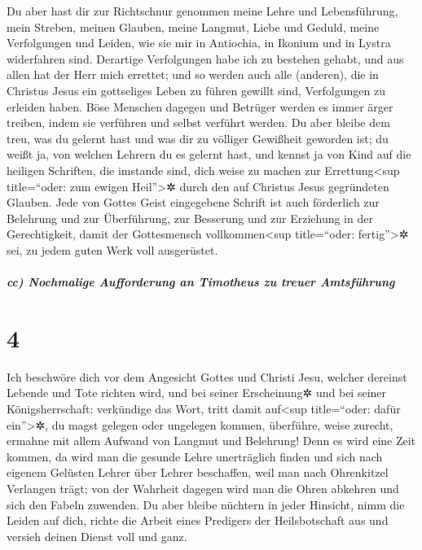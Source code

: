  Du aber hast dir zur Richtschnur genommen meine Lehre
und Lebensführung, mein Streben, meinen Glauben, meine Langmut, Liebe
und Geduld,  meine Verfolgungen und Leiden, wie sie mir
in Antiochia, in Ikonium und in Lystra widerfahren sind. Derartige
Verfolgungen habe ich zu bestehen gehabt, und aus allen hat der Herr
mich errettet;  und so werden auch alle (anderen), die in
Christus Jesus ein gottseliges Leben zu führen gewillt sind,
Verfolgungen zu erleiden haben.  Böse Menschen dagegen
und Betrüger werden es immer ärger treiben, indem sie verführen und
selbst verführt werden.  Du aber bleibe dem treu, was du
gelernt hast und was dir zu völliger Gewißheit geworden ist; du weißt
ja, von welchen Lehrern du es gelernt hast,  und kennst
ja von Kind auf die heiligen Schriften, die imstande sind, dich weise zu
machen zur Errettung\textless sup title=``oder: zum ewigen
Heil''\textgreater✲ durch den auf Christus Jesus gegründeten Glauben.
 Jede von Gottes Geist eingegebene Schrift ist auch
förderlich zur Belehrung und zur Überführung, zur Besserung und zur
Erziehung in der Gerechtigkeit,  damit der Gottesmensch
vollkommen\textless sup title=``oder: fertig''\textgreater✲ sei, zu
jedem guten Werk voll ausgerüstet.

\hypertarget{cc-nochmalige-aufforderung-an-timotheus-zu-treuer-amtsfuxfchrung}{%
\subparagraph{cc) Nochmalige Aufforderung an Timotheus zu treuer
Amtsführung}\label{cc-nochmalige-aufforderung-an-timotheus-zu-treuer-amtsfuxfchrung}}

\hypertarget{section-3}{%
\section{4}\label{section-3}}

 Ich beschwöre dich vor dem Angesicht Gottes und Christi
Jesu, welcher dereinst Lebende und Tote richten wird, und bei seiner
Erscheinung✲ und bei seiner Königsherrschaft:  verkündige
das Wort, tritt damit auf\textless sup title=``oder: dafür
ein''\textgreater✲, du magst gelegen oder ungelegen kommen, überführe,
weise zurecht, ermahne mit allem Aufwand von Langmut und Belehrung!
 Denn es wird eine Zeit kommen, da wird man die gesunde
Lehre unerträglich finden und sich nach eigenem Gelüsten Lehrer über
Lehrer beschaffen, weil man nach Ohrenkitzel Verlangen trägt;
 von der Wahrheit dagegen wird man die Ohren abkehren und
sich den Fabeln zuwenden.  Du aber bleibe nüchtern in
jeder Hinsicht, nimm die Leiden auf dich, richte die Arbeit eines
Predigers der Heilsbotschaft aus und versieh deinen Dienst voll und
ganz.

